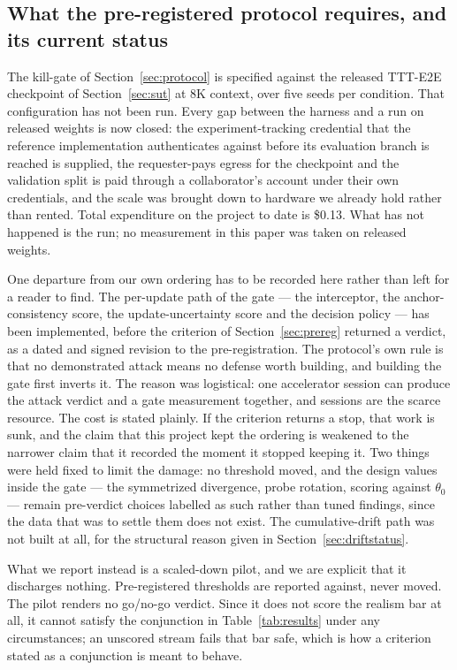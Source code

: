 \documentclass[journal]{IEEEtran}
\newcommand{\anchorp}{\theta_{0}}
\begin{document}
\subsection{What the pre-registered protocol requires, and its current status}

The kill-gate of Section~\ref{sec:protocol} is specified against the released
TTT-E2E checkpoint of Section~\ref{sec:sut} at 8K context, over five seeds per
condition. That configuration has not been run. Every gap between the harness and
a run on released weights is now closed: the experiment-tracking credential that
the reference implementation authenticates against before its evaluation branch
is reached is supplied, the requester-pays egress for the checkpoint and the
validation split is paid through a collaborator's account under their own
credentials, and the scale was brought down to hardware we already hold rather
than rented. Total expenditure on the project to date is \$0.13. What has not
happened is the run; no measurement in this paper was taken on released weights.

One departure from our own ordering has to be recorded here rather than left for
a reader to find. The per-update path of the gate --- the interceptor, the
anchor-consistency score, the update-uncertainty score and the decision policy
--- has been implemented, before the criterion of Section~\ref{sec:prereg}
returned a verdict, as a dated and signed revision to the pre-registration. The
protocol's own rule is that no demonstrated attack means no defense worth
building, and building the gate first inverts it. The reason was logistical: one
accelerator session can produce the attack verdict and a gate measurement
together, and sessions are the scarce resource. The cost is stated plainly. If the
criterion returns a stop, that work is sunk, and the claim that this project kept
the ordering is weakened to the narrower claim that it recorded the moment it
stopped keeping it. Two things were held fixed to limit the damage: no threshold
moved, and the design values inside the gate --- the symmetrized divergence, probe
rotation, scoring against $\anchorp$ --- remain pre-verdict choices labelled as
such rather than tuned findings, since the data that was to settle them does not
exist. The cumulative-drift path was not built at all, for the structural reason
given in Section~\ref{sec:driftstatus}.

What we report instead is a scaled-down pilot, and we are explicit that it
discharges nothing. Pre-registered thresholds are reported against, never moved.
The pilot renders no go/no-go verdict. Since it does not score the realism bar at
all, it cannot satisfy the conjunction in Table~\ref{tab:results} under any
circumstances; an unscored stream fails that bar safe, which is how a criterion
stated as a conjunction is meant to behave.
\end{document}
